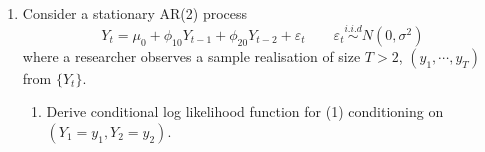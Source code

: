 \documentclass[oneside,openany]{tufte-book} %
\begin{document}
\begin{enumerate}
\begin{enumerate}
\begin{enumerate}
		\item The effect of a unit shock to $Y_{2t}$ on $Y_{1t}$ and $Y_{2t}$, (namely $\epsilon_t=\left(\begin{array}{c} 0 \\ 1 \end{array}\right)$ and $\epsilon_s= \left(\begin{array}{c} 0 \\ 0 \end{array}\right)$ for all $s\neq t$).
		\begin{eqnarray*}
			\text{Effect on }Y_{1} &:&0,\text{ }0.1,\text{ }0.17 \\
			\text{Effect on }Y_{2} &:&1,\text{ }1.1,\text{ \thinspace }1.15
		\end{eqnarray*}
	\end{enumerate}
					\end{enumerate}	
					
					\vspace{14pt}
					
					
					\item Consider a stationary AR(2) process
					\begin{equation} Y_t=\mu_0+ \phi_{10} Y_{t-1}+\phi_{20}Y_{t-2} +\varepsilon_t  \qquad 	 \varepsilon _{t}\overset{i.i.d}{\sim} N(0,\sigma^2) \end{equation}
					where a researcher observes a sample realisation of size $T>2$, $(y_1,\cdots, y_T)$ from $\{Y_t\}$.
					\begin{enumerate}
						\item Derive conditional log likelihood function for (1) conditioning on $(Y_1=y_1,Y_2=y_2)$.
						\medskip
						

\end{enumerate}
\end{enumerate}
\end{document}
